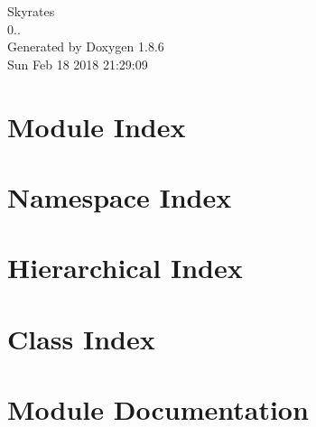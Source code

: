 \documentclass[twoside]{book}
\newcommand{\clearemptydoublepage}{%
  \newpage{\pagestyle{empty}\cleardoublepage}%
}
\begin{document}
\hypersetup{pageanchor=false}
\begin{titlepage}
\vspace*{7cm}
\begin{center}%
{\Large Skyrates \\[1ex]\large 0.. }\\
\vspace*{1cm}
{\large Generated by Doxygen 1.8.6}\\
\vspace*{0.5cm}
{\small Sun Feb 18 2018 21:29:09}\\
\end{center}
\end{titlepage}
\clearemptydoublepage
\tableofcontents
\clearemptydoublepage
{}
\hypersetup{pageanchor=true}

\chapter{Module Index}

\chapter{Namespace Index}

\chapter{Hierarchical Index}

\chapter{Class Index}

\chapter{Module Documentation}




\end{document}
